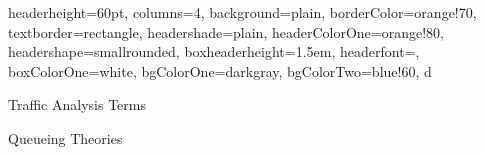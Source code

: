 \documentclass[landscape,fontscale=1,margin=0.2cm,paperwidth=60truecm, paperheight=34truecm,debug]{baposter}
\begin{document}
\begin{poster}{
  headerheight=60pt,
  columns=4,
  background=plain,
  borderColor=orange!70,
  textborder=rectangle,
  headershade=plain,
  headerColorOne=orange!80,
  headershape=smallrounded,
  boxheaderheight=1.5em,
  headerfont={},
  boxColorOne=white,
  bgColorOne=darkgray,
  bgColorTwo=blue!60,
}{}{\Large{\color{white}{Single Cycle Datapath}}}{}{d}

\begin{posterbox}[column=0]{Traffic Analysis Terms}
\end{posterbox}

\begin{posterbox}[column=0,below=auto,textborder=rounded]{Queueing Theories}
\end{posterbox}
\end{poster}
\end{document}
